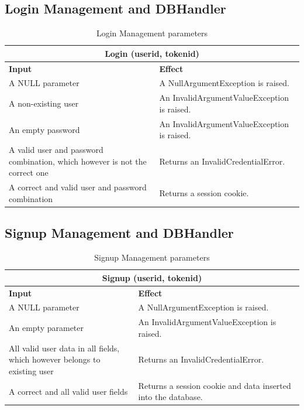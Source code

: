 \documentclass[a4paper, hidelinks, 12pt]{report}
\begin{document}
	\subsection{Login Management and DBHandler}
	\begin{table}[H]
		\centering
		\begin{tabular}{|p{6cm}|p{9cm}|}
			\hline\hline
			\multicolumn{2}{c}{\textbf{Login (userid, tokenid)} }\\
			\hline
			\textbf{Input} & \textbf{Effect} \\ [0.5ex]
			\hline
			A NULL parameter & A NullArgumentException is raised.  \\
			\hline
			A non-existing user & An InvalidArgumentValueException is raised.\\
			\hline
			An empty password & An InvalidArgumentValueException is raised.\\
			\hline
			A valid user and password
combination, which however is not the correct one & Returns an InvalidCredentialError.\\
\hline
			A correct and valid user and password combination & Returns a session cookie.\\
			\hline
			
		\end{tabular}
		\caption{Login Management parameters}
		\label{fig:Login Management parameters}
	\end{table}
	
	\subsection{Signup Management and DBHandler}
	\begin{table}[H]
		\centering
		\begin{tabular}{|p{6cm}|p{9cm}|}
			\hline\hline
			\multicolumn{2}{c}{\textbf{Signup (userid, tokenid)} }\\
			\hline
			\textbf{Input} & \textbf{Effect} \\ [0.5ex]
			\hline
			A NULL parameter & A NullArgumentException is raised.  \\
			\hline
			An empty parameter & An InvalidArgumentValueException is raised.\\
			\hline
			All valid user data in all fields, which however belongs to existing user & Returns an InvalidCredentialError.\\
\hline
			A correct and all valid user fields & Returns a session cookie and data inserted into the database.\\
			\hline
			
		\end{tabular}
		\caption{Signup Management parameters}
		\label{fig:Signup Management parameters}
	\end{table}
\end{document}
